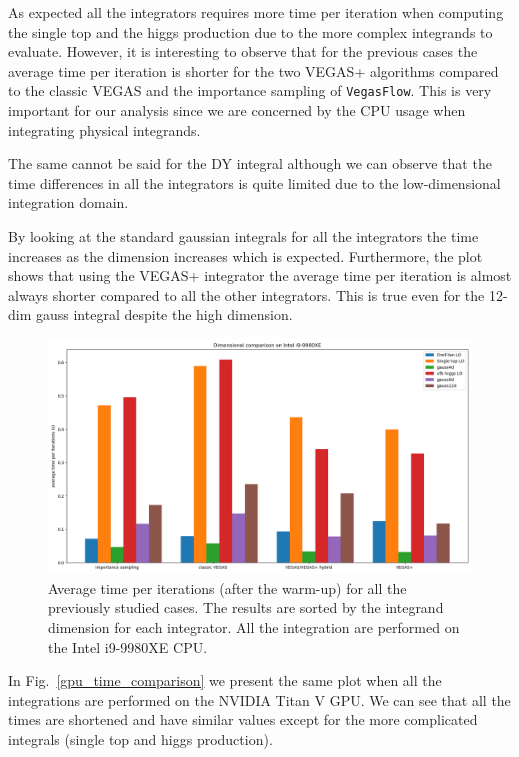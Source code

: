 \documentclass[../main/main.tex]{subfiles}
\begin{document}
As expected all the integrators requires more time per iteration when computing the single top and the higgs production due to the more complex integrands to evaluate. However, it is interesting to observe that for the previous cases the average time per iteration is shorter for the two VEGAS+ algorithms compared to the classic VEGAS and the importance sampling of \texttt{VegasFlow}.
This is very important for our analysis since we are concerned by the CPU usage when integrating physical integrands. 

The same cannot be said for the DY integral although we can observe that the time differences in all the integrators is quite limited due to the low-dimensional integration domain.

By looking at the standard gaussian integrals for all the integrators the time increases as the dimension increases which is expected. Furthermore, the plot shows that using the VEGAS+ integrator the average time per iteration is almost always shorter compared to all the other integrators. This is true even for the 12-dim gauss integral despite the high dimension.


\begin{figure}[h]
	\centering
	\includegraphics[width=\textwidth]{../images/dim_comparison_CPU.png}
	\caption{Average time per iterations (after the warm-up) for all the previously studied cases. The results are sorted by the integrand dimension for each integrator. All the integration are performed on the Intel i9-9980XE CPU. }
	\label{cpu_time_comparison}
\end{figure}

In Fig.~\ref{gpu_time_comparison} we present the same plot when all the integrations are performed on the NVIDIA Titan V GPU. We can see that all the times are shortened and have similar values except for the more complicated integrals (single top and higgs production).
\end{document}
